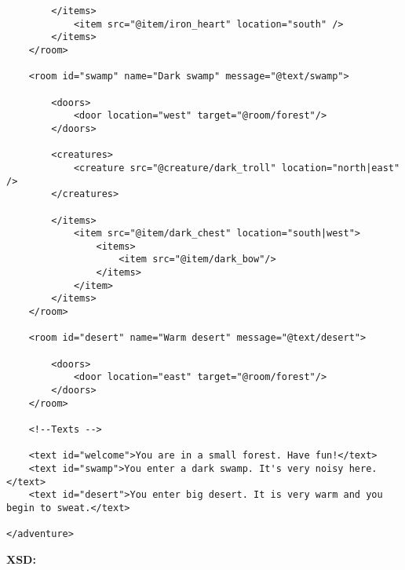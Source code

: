 \begin{lstlisting}
        </items>
            <item src="@item/iron_heart" location="south" />
        </items>
    </room>

    <room id="swamp" name="Dark swamp" message="@text/swamp">

        <doors>
            <door location="west" target="@room/forest"/>
        </doors>

        <creatures>
            <creature src="@creature/dark_troll" location="north|east" />
        </creatures>

        </items>
            <item src="@item/dark_chest" location="south|west">
                <items>
                    <item src="@item/dark_bow"/>
                </items>
            </item>
        </items>
    </room>

    <room id="desert" name="Warm desert" message="@text/desert">

        <doors>
            <door location="east" target="@room/forest"/>
        </doors>
    </room>

    <!--Texts -->

    <text id="welcome">You are in a small forest. Have fun!</text>
    <text id="swamp">You enter a dark swamp. It's very noisy here.</text>
    <text id="desert">You enter big desert. It is very warm and you begin to sweat.</text>

</adventure>
\end{lstlisting}
\textbf{XSD:}
\lstset{language=XML}
